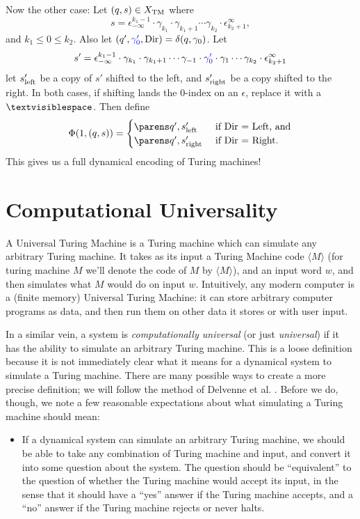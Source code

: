 \documentclass{fkpaper}
\newcommand{\blank}{\textvisiblespace}
\begin{document}
\begin{multicols}{2}
Now the other case: Let $(q, s) \in X_{\rm TM}$ where
\[
  s = \epsilon_{-\infty}^{k_1-1} \cdot \gamma_{k_1} \cdot \gamma_{k_1
    + 1} \cdots \gamma_{k_2} \cdot \epsilon_{k_2+1}^\infty,
\]
and $k_1 \leq 0 \leq k_2$. Also let $(q', {\color{blue} \gamma'_0},
{\mathrm{Dir}}) = \delta(q, \gamma_0)$. Let
\[
  s' = \epsilon_{-\infty}^{k_1 - 1} \cdot \gamma_{k_1} \cdot
  \gamma_{k_1 + 1} \cdots \gamma_{-1} \cdot {\color{blue} \gamma'_0}
  \cdot \gamma_1 \cdots \gamma_{k_2} \cdot \epsilon_{k_2+1}^\infty
\]
let $s'_{\rm left}$ be a copy of $s'$ shifted to the left, and
$s'_{\rm right}$ be a copy shifted to the right. In both cases, if
shifting lands the $0$-index on an $\epsilon$, replace it with a
$\blank$. Then define
\[
  \Phi(1, (q, s)) =
  \begin{cases}
    \pn{q', s'_{\rm left}} & \text{ if Dir $ = $ Left, and}\\
    \pn{q', s'_{\rm right}} & \text{ if Dir $ = $ Right}.
  \end{cases}
\]
This gives us a full dynamical encoding of Turing machines!





\section{Computational Universality}

A Universal Turing Machine is a Turing machine which can simulate any
arbitrary Turing machine. It takes as its input a Turing Machine code $\langle M \rangle$ (for turing machine $M$ we'll denote the code of $M$ by $\langle M \rangle$), and an input word $w$, and then simulates what $M$ would do on input $w$. Intuitively, any modern computer is a (finite memory) Universal Turing Machine: it can store arbitrary computer programs as data, and then run them on other data it stores or with user input.

In a similar vein, a system is {\it computationally universal} (or
just {\it universal}) if it has the ability to simulate an arbitrary
Turing machine. This is a loose definition because it is not
immediately clear what it means for a dynamical system to simulate a
Turing machine. There are many possible ways to create a more precise
definition; we will follow the method of Delvenne et al. \cite{Delvenne2004Apr}.
Before we do, though, we note a few reasonable expectations about what
simulating a Turing machine should mean:

\begin{itemize}
  \item If a dynamical system can simulate an arbitrary Turing machine, we should be able to take any combination of Turing machine and input, and convert it into some question about the system. The question should be ``equivalent'' to the question of whether the Turing machine would accept its input, in the sense that it should have a ``yes'' answer if the Turing machine accepts, and a ``no'' answer if the Turing machine rejects or never halts.


\end{itemize}
\end{multicols}
\end{document}
